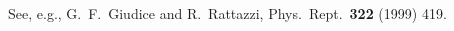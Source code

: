 \documentclass[epj,nopacs,fleqn]{svjour}
\begin{document}
\appendix
\section{}
\label{sec:app1}

\begin{thebibliography}{00}

  See, e.g.,
  G.~F.~Giudice and R.~Rattazzi,
  Phys.\ Rept.\  {\bf 322} (1999) 419.

\end{thebibliography}
\end{document}
